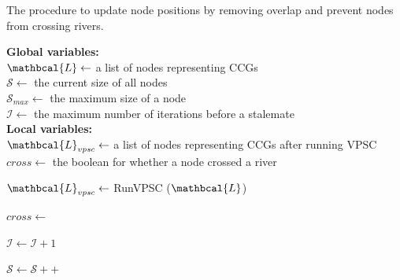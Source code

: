 \begin{algorithm}[tb!]
    \caption{The procedure to update node positions by removing overlap and prevent nodes from crossing rivers.}\label{alg:UpdateNodePosition}
    \textbf{Global variables:} \\
    $ \mathbcal{L} \gets $ a list of nodes representing CCGs \\
    $ \mathcal{S} \gets $ the current size of all nodes \\
    $ \mathcal{S}_{max} \gets $ the maximum size of a node \\
    $ \mathcal{I} \gets $ the maximum number of iterations before a stalemate \\

    \textbf{Local variables:} \\
    $ \mathbcal{L}_{vpsc} \gets $ a list of nodes representing CCGs after running VPSC \\
    $ cross \gets $ the boolean for whether a node crossed a river \\

    \begin{algorithmic}[1]

        \State $ \mathbcal{L}_{vpsc} \gets $ RunVPSC ($ \mathbcal{L} $)


                    \State $ cross \gets $ 

                        \State $ \mathcal{I} \gets \mathcal{I} + 1 $

                            \State {}
                        \Else
                            \State {}
                        \EndIf

                    \EndIf

                \EndIf

            \EndFor

        \EndWhile

        \State $ \mathcal{S} \gets \mathcal{S} ++$

        \EndProcedure
    \end{algorithmic}
\end{algorithm}


